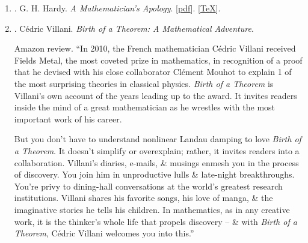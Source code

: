 \documentclass{article}
\begin{document}
\begin{enumerate}
	\item \cite{Hardy1940, Hardy1992, Hardy2022}. G. H. Hardy. {\it A Mathematician's Apology}. [\href{https://github.com/NQBH/hobby/blob/master/advanced_mathematics/Hardy2017/NQBH_Hardy2017.pdf}{pdf}]. [\href{https://github.com/NQBH/hobby/blob/master/advanced_mathematics/Hardy2017/NQBH_Hardy2017.tex}{\TeX}].\hfill{\sf[done]}
	
	\item \cite{Villani2015}. {\sc C\'edric Villani}. {\it Birth of a Theorem: A Mathematical Adventure}. {}
	
	{\sf Amazon review.} ``In 2010, the French mathematician {\sc C\'edric Villani} received Fields Metal, the most coveted prize in mathematics, in recognition of a proof that he devised with his close collaborator {\sc Cl\'ement Mouhot} to explain 1 of the most surprising theories in classical physics. {\it Birth of a Theorem} is {\sc Villani}'s own account of the years leading up to the award. It invites readers inside the mind of a great mathematician as he wrestles with the most important work of his career.
	
	But you don't have to understand nonlinear Landau damping to love {\it Birth of a Theorem}. It doesn't simplify or overexplain; rather, it invites readers into a collaboration. {\sc Villani}'s diaries, e-mails, \& musings enmesh you in the process of discovery. You join him in unproductive lulls \& late-night breakthroughs. You're privy to dining-hall conversations at the world's greatest research institutions. {\sc Villani} shares his favorite songs, his love of manga, \& the imaginative stories he tells his children. In mathematics, as in any creative work, it is the thinker's whole life that propels discovery -- \& with {\it Birth of a Theorem}, {\sc C\'edric Villani} welcomes you into this.''
	

\end{enumerate}
\end{document}
